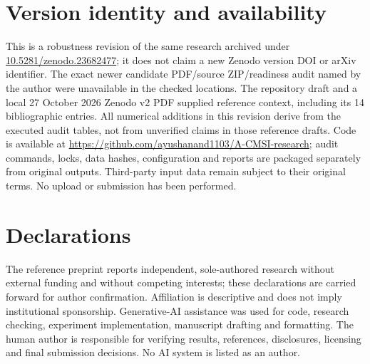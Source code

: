 \documentclass[11pt]{article}
\begin{document}
\section*{Version identity and availability}
This is a robustness revision of the same research archived under
\href{https://doi.org/10.5281/zenodo.23682477}{10.5281/zenodo.23682477}; it does not claim a new
Zenodo version DOI or arXiv identifier. The exact newer candidate PDF/source ZIP/readiness audit
named by the author were unavailable in the checked locations. The repository draft and a local
27 October 2026 Zenodo v2 PDF supplied reference context, including its 14 bibliographic entries.
All numerical additions in this revision derive from the executed audit tables, not from unverified
claims in those reference drafts. Code is available at
\url{https://github.com/ayushanand1103/A-CMSI-research}; audit commands, locks, data hashes,
configuration and reports are packaged separately from original outputs. Third-party input data
remain subject to their original terms. No upload or submission has been performed.

\section*{Declarations}
The reference preprint reports independent, sole-authored research without external funding and
without competing interests; these declarations are carried forward for author confirmation.
Affiliation is descriptive and does not imply institutional sponsorship. Generative-AI assistance
was used for code, research checking, experiment implementation, manuscript drafting and formatting.
The human author is responsible for verifying results, references, disclosures, licensing and final
submission decisions. No AI system is listed as an author.



\end{document}
